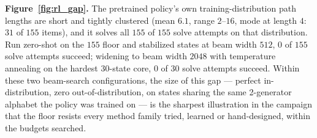 \textbf{Figure~\ref{fig:rl_gap}.} The pretrained policy's own training-distribution path
lengths are short and tightly clustered (mean $6.1$, range $2$--$16$, mode at length $4$:
$31$ of $155$ items), and it solves all $155$ of $155$ solve attempts on that distribution.
Run zero-shot on the $155$ floor and stabilized states at beam width $512$, $0$ of $155$
solve attempts succeed; widening to beam width $2048$ with temperature annealing on the
hardest $30$-state core, $0$ of $30$ solve attempts succeed. Within these two beam-search
configurations, the size of this gap --- perfect in-distribution, zero out-of-distribution,
on states sharing the same 2-generator alphabet the policy was trained on --- is the sharpest
illustration in the campaign that the floor resists every method family tried, learned or
hand-designed, within the budgets searched.
